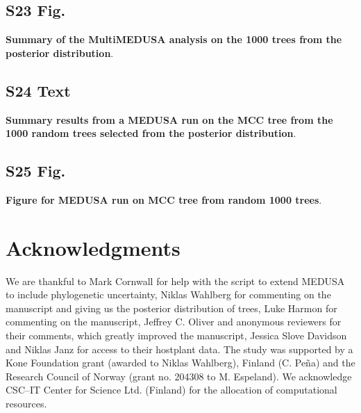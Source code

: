 \documentclass[10pt,letterpaper]{article}
\begin{document}
\subsection*{S23 Fig.}
\label{S23_Figure}
{\bf Summary of the MultiMEDUSA
analysis on the 1000 trees from the posterior distribution}.

\subsection*{S24 Text}
\label{S24_Text}
{\bf Summary results from a MEDUSA
run on the MCC tree from the 1000 random trees selected from the
posterior distribution}.

\subsection*{S25 Fig.}
\label{S25_Figure}
{\bf Figure for MEDUSA run on MCC tree from random 1000 trees}.

\section*{Acknowledgments}
We are thankful to Mark Cornwall for help with the script to extend
MEDUSA to include phylogenetic uncertainty, Niklas Wahlberg for
commenting on the manuscript and giving us the posterior distribution of
trees, Luke Harmon for commenting on the manuscript, Jeffrey C. Oliver and anonymous
reviewers for their comments, which greatly improved the manuscript,
Jessica Slove Davidson and Niklas Janz for access to their hostplant
data. The study was supported by a Kone Foundation grant (awarded to
Niklas Wahlberg), Finland (C. Pe\~na) and the Research Council of Norway
(grant no. 204308 to M. Espeland). We acknowledge CSC--IT Center for
Science Ltd. (Finland) for the allocation of computational resources.

\nolinenumbers


{}
\end{document}
